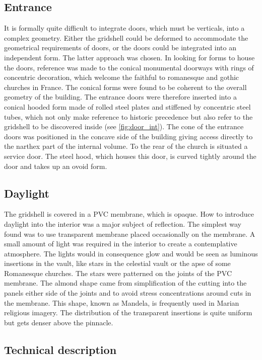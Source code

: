\subsection{Entrance}
It is formally quite difficult to integrate doors, which must be verticals, into a complex geometry. Either the gridshell could be deformed to accommodate the geometrical requirements of doors, or the doors could be integrated into an independent form. The latter approach was chosen. In looking for forms to house the doors, reference was made to the conical monumental doorways with rings of concentric decoration, which welcome the faithful to romanesque and gothic churches in France. The conical forms were found to be coherent to the overall geometry of the building. The entrance doors were therefore inserted into a conical hooded form made of rolled steel plates and stiffened by concentric steel tubes, which not only make reference to historic precedence but also refer to the gridshell to be discovered inside (see \cref{fig:door_int}). The cone of the entrance doors was positioned in the concave side of the building giving access directly to the narthex part of the internal volume. To the rear of the church is situated a service door. The steel hood, which houses this door, is curved tightly around the door and takes up an ovoid form.

\subsection{Daylight}
The gridshell is covered in a PVC membrane, which is opaque. How to introduce daylight into the interior was a major subject of reflection. The simplest way found was to use transparent membrane placed occasionally on the membrane. A small amount of light was required in the interior to create a contemplative atmosphere. The lights would in consequence glow and would be seen as luminous insertions in the vault, like stars in the celestial vault or the apse of some Romanesque churches. The stars were patterned on the joints of the PVC membrane. The almond shape came from simplification of the cutting into the panels either side of the joints and to avoid stress concentrations around cuts in the membrane. This shape, known as Mandela, is frequently used in Marian religious imagery. The distribution of the transparent insertions is quite uniform but gets denser above the pinnacle.

\subsection{Technical description}

